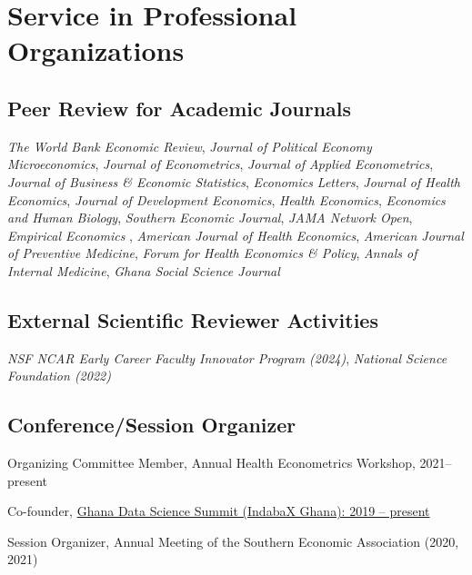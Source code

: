\documentclass[12pt,letterpaper]{article}
\renewenvironment{itemize}{
	\begin{list}{}{
			\setlength{\leftmargin}{1em}
			\setlength{\itemsep}{0.15em}
			\setlength{\parskip}{0pt}
			\setlength{\parsep}{0.2em}
		}
	}{
	\end{list}
}
\begin{document}
\section*{Service in Professional Organizations}
\subsection*{Peer Review for Academic Journals}
\begin{itemize}
	\item 
	\textit{The World Bank Economic Review},
	\textit{Journal of Political Economy Microeconomics},
	\textit{Journal of Econometrics},
	\textit{Journal of Applied Econometrics},
	\textit{Journal of Business \& Economic Statistics}, 
	\textit{Economics Letters},
	\textit{Journal of Health Economics}, 
	\textit{Journal of Development Economics}, 
	\textit{Health Economics}, 
	\textit{Economics and Human Biology},
	\textit{Southern Economic Journal},
	\textit{JAMA Network Open},
	\textit{Empirical Economics },
	\textit{American Journal of Health Economics},
	\textit{American Journal of Preventive Medicine},
	\textit{Forum for Health Economics \& Policy},
	\textit{Annals of Internal Medicine},
	\textit{Ghana Social Science Journal}
\end{itemize}
\subsection*{External Scientific Reviewer Activities}
\begin{itemize}
	\item 
	\textit{NSF NCAR Early Career Faculty Innovator Program (2024)},
	\textit{National Science Foundation (2022)}
\end{itemize}
\subsection*{Conference/Session Organizer}
\begin{itemize}
	\item Organizing Committee Member, Annual Health Econometrics Workshop, 2021--present 
	\item Co-founder, \href{https://datasciencenet.org}{Ghana Data Science Summit (IndabaX Ghana): 2019 -- present}
	\item Session Organizer, Annual Meeting of the Southern Economic Association (2020, 2021)
\end{itemize}
\end{document}
